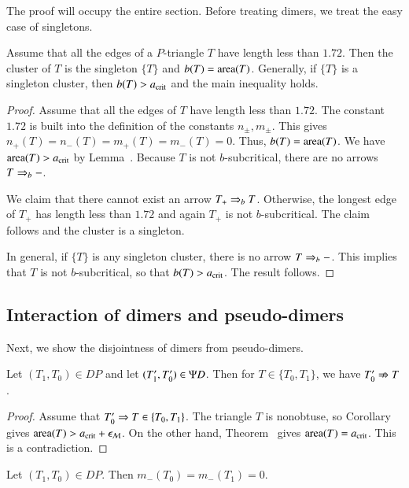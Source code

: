 The proof will occupy the entire section.  Before treating dimers, we
treat the easy case of singletons.

\begin{lemma}  
  Assume that all the edges of a $P$-triangle $T$ have length less
  than $1.72$.  Then the cluster of $T$ is the singleton $\{T\}$ and
  $b(T) ={\operatorname{area}}(T)$.  Generally, if $\{T\}$ is a singleton
  cluster, then $b(T) > a_\text{crit}$ and the main inequality holds.
\end{lemma}

\begin{proof} 
  Assume that all the edges of $T$ have length less than $1.72$.  The
  constant $1.72$ is built into the definition of the constants
  $n_\pm,m_\pm$. This gives $n_+(T)=n_-(T) = m_+(T)=m_-(T)=0$.  Thus,
  $b(T)={\operatorname{area}}(T)$.  We have ${\operatorname{area}}(T) > a_\text{crit}$ by
  Lemma~.  Because $T$ is not $b$-subcritical, there are
  no arrows $T\Rightarrow_{b} -$.

  We claim that there cannot exist an arrow $T_+\Rightarrow_{b} T$.  Otherwise,
  the longest edge of $T_+$ has length less than $1.72$ and again
  $T_+$ is not $b$-subcritical.  The claim follows and the cluster is
  a singleton.

  In general, if $\{T\}$ is any singleton cluster, there is no arrow
  $T\Rightarrow_{b} -$.  This implies that $T$ is not $b$-subcritical, so that
  $b(T) > a_\text{crit}$.  The result follows.
\end{proof}

\subsection{Interaction of dimers and pseudo-dimers}

Next, we show the disjointness of dimers from pseudo-dimers.

\begin{lemma}
  Let $(T_1,T_0)\in DP$ and let $(T'_1,T'_0)\in\Psi D$.  Then for
  $T\in\{T_0,T_1\}$, we have $T'_0\nRightarrow T$.
\end{lemma}

\begin{proof} 
Assume that $T'_0\Rightarrow T\in\{T_0,T_1\}$. The triangle $T$ is
nonobtuse, so Corollary~ gives
${\operatorname{area}}(T)>a_\text{crit}+\epsilon_{\mathcal M}$. On the other hand,
Theorem~ gives ${\operatorname{area}}(T)=a_\text{crit}$.
This is a contradiction.
\end{proof}

\begin{corollary}  
  Let $(T_1,T_0)\in DP$. Then %
  $m_-(T_0)=m_-(T_1)=0$.
\end{corollary}

